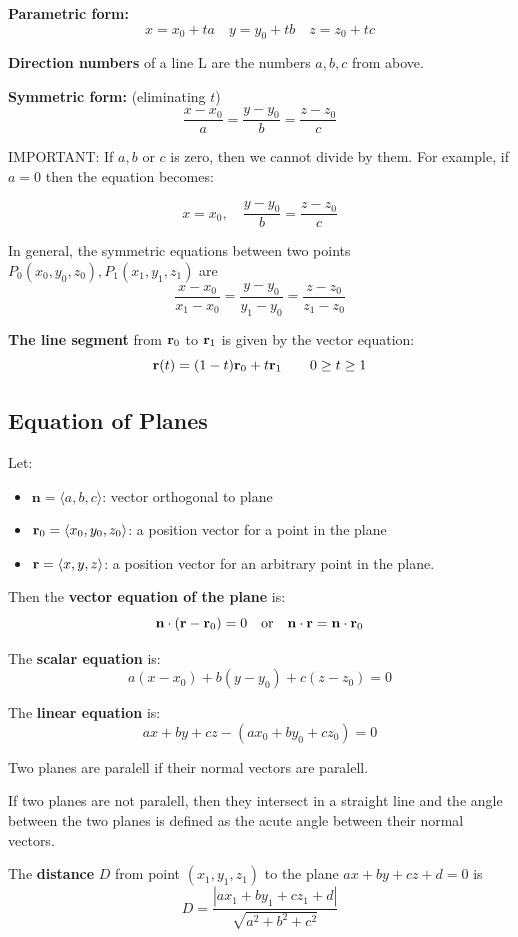 \documentclass{report}
\begin{document}
\textbf{Parametric form:}
\[
x = x_0 + t a \quad y = y_0 + t b \quad z = z_0 + t c
\]

\textbf{Direction numbers} of a line L are the numbers $a, b, c$ from above. 

\textbf{Symmetric form:} (eliminating $t$) 
\[
\frac{x - x_0}{a} = \frac{y - y_0}{b} = \frac{z - z_0}{c}
\]

IMPORTANT: If $a, b$ or $c$ is zero, then we cannot divide by them.
For example, if $a = 0$ then the equation becomes:

\[
x = x_0, \quad \frac{y - y_0}{b} = \frac{z - z_0}{c}
\]

In general, the symmetric equations between two points $P_0(x_0, y_0, z_0), P_1(x_1, y_1, z_1)$ are 
\[
\frac{x - x_0}{x_1 - x_0} = \frac{y - y_0}{y_1 - y_0} = \frac{z - z_0}{z_1 - z_0}
\]

\textbf{The line segment} from $\mathbf{r}_0$ to $\mathbf{r}_1$ is given by the vector equation:
\[
\mathbf{r}(t) = (1 - t)\mathbf{r}_0 + t \mathbf{r}_1 \quad \quad 0 \ge t \ge 1
\]

\subsection{Equation of Planes}

Let: 
\begin{itemize}
    \item $\mathbf{n} = \langle a, b, c \rangle$: vector orthogonal to plane
    \item $\mathbf{r}_0 = \langle x_0, y_0, z_0 \rangle$: a position vector for a point in the plane 
    \item $\mathbf{r} = \langle x, y, z \rangle$: a position vector for an arbitrary point in the plane.
\end{itemize}

Then the \textbf{vector equation of the plane} is: 
\[
\mathbf{n} \cdot (\mathbf{r} - \mathbf{r}_0) = 0 \quad \text{or} \quad \mathbf{n} \cdot \mathbf{r} = \mathbf{n} \cdot \mathbf{r}_0
\]

The \textbf{scalar equation} is:
\[
a(x - x_0) + b(y - y_0) + c(z - z_0) = 0
\]

The \textbf{linear equation} is:
\[
ax + by + cz - (a x_0 + b y_0 + c z_0) = 0
\] 

Two planes are paralell if their normal vectors are paralell.

If two planes are not paralell, then they intersect in a straight line and the angle between the two planes 
is defined as the acute angle between their normal vectors.

The \textbf{distance} $D$ from point $(x_1, y_1, z_1)$ to the plane 
$ax + by + cz + d = 0$ is 
\[
D = \frac{|a x_1 + b y_1 + c z_1 + d|}{\sqrt{a^2 + b^2 + c^2}}
\]
\end{document}
